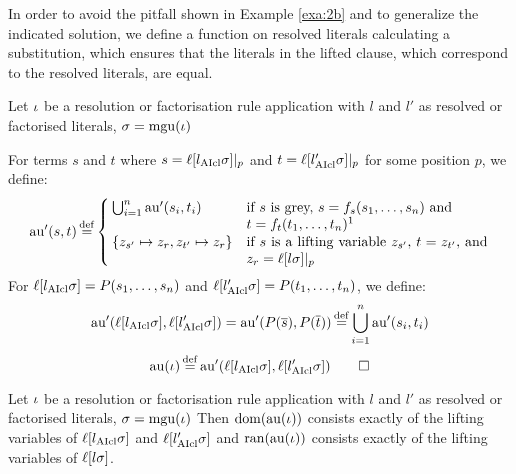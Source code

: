 \documentclass[,%
	draft=false,%
	numbers=noendperiod
	11pt,
	a4paper,
	oneside,%
	openany,
]{memoir}
\begin{document}
In order to avoid the pitfall shown in Example \ref{exa:2b} and to generalize the indicated solution,
we define a function on resolved literals calculating a substitution, which ensures that the literals in the lifted clause, which correspond to the resolved literals, are equal.

\begin{defi}[$\aiu$]
	Let $\iota$ be a resolution or factorisation rule application with $l$ and $l'$ as resolved or factorised literals, $\sigma = \operatorname{mgu}(\iota)$

	\newcommand{\aiuP}{\aiu'}

	For terms $s$ and $t$ where
	$s = \ell[l_{\operatorname{AIcl}}\sigma]|_{p}$
	and
	$t = \ell[l'_{\operatorname{AIcl}}\sigma]|_{p}$
	for some position $p$, we define:
	\[
		\aiuP (s, t) \defeq
		\begin{cases}
			\bigcup_{i=1}^n \aiuP(s_i, t_i) &
			\parbox[t]{.50\textwidth}{
			if $s$ is grey, $s=f_s(s_1, \dots, s_n)$ and\newline$t = f_{t}(t_1,\dots, t_n)$\footnotemark} \\
			\{z_{s'} \mapsto z_r, z_{t'} \mapsto z_r\} &
			\parbox[t]{.50\textwidth}{
				if $s$ is a lifting variable $z_{s'}$, $t = z_{t'}$,
				and $z_r = \lifboth{l\sigma}\at{p}$
			}
		\end{cases}
	\]
	For $\ell[l_{\operatorname{AIcl}}\sigma] = P(s_1, \dots, s_n)$ and $\ell[l'_{\operatorname{AIcl}}\sigma] = P(t_1, \dots, t_n)$, we define:
	\[
		\aiuP(\lifboth{l\cl\sigma}, \lifboth{l'\cl\sigma}) =
		\aiuP(P(\overline s), P(\overline t)) \defeq \bigcup_{i=1}^n \aiuP(s_i, t_i)
	\]
	\[
		\aiu(\inference) \defeq \aiuP(\lifboth{l\cl\sigma}, \lifboth{l'\cl\sigma}) \qedhere
	\]
\end{defi}

\begin{prop}
	\label{prop:tau_dom_ran}
	Let $\iota$ be a resolution or factorisation rule application with $l$ and $l'$ as resolved or factorised literals, $\sigma = \operatorname{mgu}(\iota)$
	Then $\operatorname{dom}(\operatorname{au}(\iota))$ consists exactly of the lifting variables of $\ell[l_{\operatorname{AIcl}}\sigma]$ and $\ell[l'_{\operatorname{AIcl}}\sigma]$ and $\operatorname{ran}(\operatorname{au}(\iota))$ consists exactly of the lifting variables of $\ell[l\sigma]$.
\end{prop}
\end{document}

